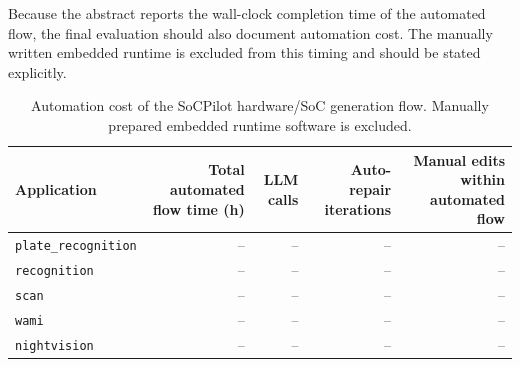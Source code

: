 Because the abstract reports the wall-clock completion time of the automated flow, the final evaluation should also document automation cost. The manually written embedded runtime is excluded from this timing and should be stated explicitly.

\begin{table}[t]
\centering
\caption{Automation cost of the SoCPilot hardware/SoC generation flow. Manually prepared embedded runtime software is excluded.}
\label{tab:automation_cost}
\renewcommand{\arraystretch}{1.12}
\begin{tabular}{lrrrr}
\toprule
\textbf{Application} &
\textbf{Total automated flow time (h)} &
\textbf{LLM calls} &
\textbf{Auto-repair iterations} &
\textbf{Manual edits within automated flow} \\
\midrule
\texttt{plate\_recognition} & -- & -- & -- & -- \\
\texttt{recognition}        & -- & -- & -- & -- \\
\texttt{scan}               & -- & -- & -- & -- \\
\texttt{wami}               & -- & -- & -- & -- \\
\texttt{nightvision}        & -- & -- & -- & -- \\
\bottomrule
\end{tabular}
\end{table}

